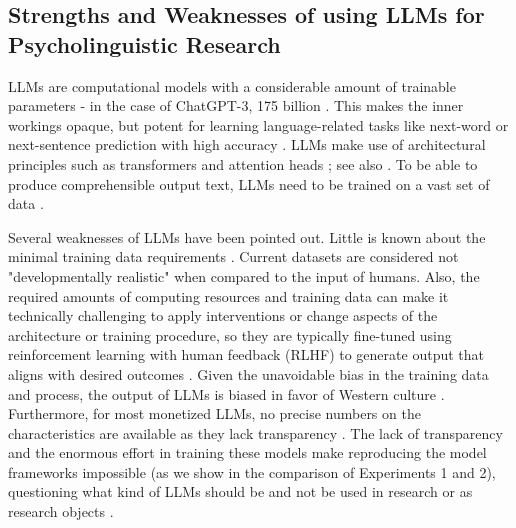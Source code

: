\documentclass[doc, a4paper]{apa7}
\begin{document}
\subsection*{Strengths and Weaknesses of using LLMs for Psycholinguistic Research}

LLMs are computational models with a considerable amount of trainable parameters - in the case of ChatGPT-3, 175 billion \citep{brown_language_2020}. This makes the inner workings opaque, but potent for learning language-related tasks like next-word or next-sentence prediction with high accuracy \citep[e.g.,][]{devlin2019bertpretrainingdeepbidirectional}. LLMs make use of architectural principles such as transformers and attention heads \citep{vaswani_attention_2017}; see also \citep[for an introduction]{hussain_tutorial_2024}. To be able to produce comprehensible output text, LLMs need to be trained on a vast set of data \citep{bender_dangers_2021}. 

Several weaknesses of LLMs have been pointed out. Little is known about the minimal training data requirements \citep{hosseini_artificial_2022}. Current datasets are considered not "developmentally realistic" when compared to the input of humans. Also, the required amounts of computing resources and training data can make it technically challenging to apply interventions or change aspects of the architecture or training procedure, so they are typically fine-tuned using reinforcement learning with human feedback (RLHF) to generate output that aligns with desired outcomes \citep[see][for how to remove troubling model outputs]{ouyang_training_2022}. Given the unavoidable bias in the training data and process, the output of LLMs is biased in favor of Western culture \citep{atari_which_2023}. Furthermore, for most monetized LLMs, no precise numbers on the characteristics are available as they lack transparency \citep{liesenfeld_opening_2023, frank_openly_2023}. The lack of transparency and the enormous effort in training these models make reproducing the model frameworks impossible (as we show in the comparison of Experiments 1 and 2), questioning what kind of LLMs should be and not be used in research or as research objects \citep{bender_dangers_2021, liesenfeld_opening_2023}. 
\end{document}
